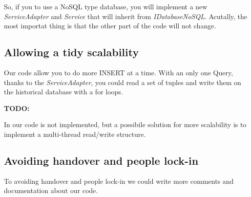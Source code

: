 So, if you to use a NoSQL type database, you will implement a new \textit{ServiceAdapter} and \textit{Service} that will inherit from \textit{IDatabaseNoSQL}. Acutally, the most importat thing is that the other part of the code will not change.

\subsection{Allowing a tidy scalability}

Our code allow you to do more INSERT at a time. With an only one Query, thanks to the \textit{ServiceAdapter}, you could read a set of tuples and write them on the historical database with a for loops.

\textbf{TODO:}

In our code is not implemented, but a possibile solution for more scalability is to implement a multi-thread read/write structure.

\subsection{Avoiding handover and people lock-in}

To avoiding handover and people lock-in we could write more comments and documentation about our code.
